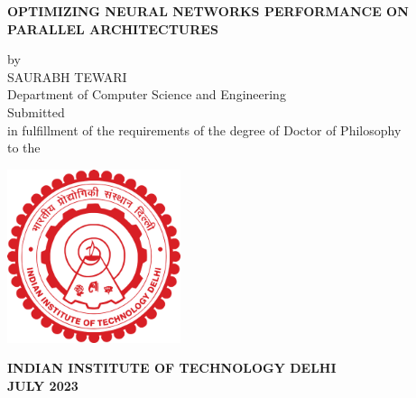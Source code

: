 
\begin{center}


\LARGE
\MakeUppercase{\textbf{OPTIMIZING NEURAL NETWORKS PERFORMANCE ON PARALLEL ARCHITECTURES}}\\
\vspace{1cm}

\large

{by}\\
\vspace{.3cm}
{SAURABH TEWARI}\\
\vspace{.3cm}
{Department of Computer Science and Engineering}\\
\vspace{2cm}
{Submitted}\\
\vspace{0.3cm}
{in fulfillment of the requirements of the degree of Doctor of Philosophy}\\
\vspace{3cm}
{to the }\\
\vspace{1cm}

\hspace{0cm}
\centering
\hbox{\includegraphics[width=12pc]{ThesisSpecificPages/iitd-logo.pdf}}

\vspace{0.3cm}
{\bf
\large{INDIAN INSTITUTE OF TECHNOLOGY DELHI}\\
\large{JULY 2023}\\
}


\end{center}


